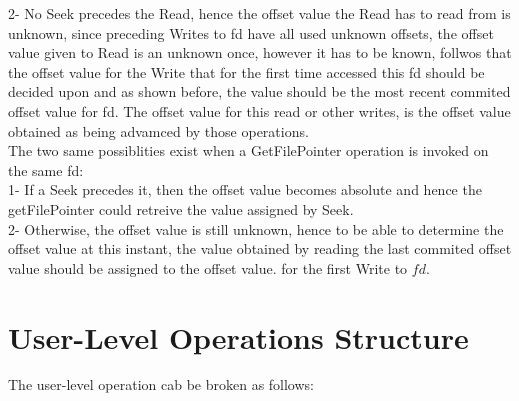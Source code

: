 \documentclass[a4paper, 11pt]{article}
\begin{document}
2- No Seek precedes the Read, hence the offset value the Read has to read from is unknown, since preceding Writes to fd have all used unknown offsets, the offset value given to Read is an unknown once, however it has to be known, follwos that the offset value for the Write that for the first time accessed this fd should be decided upon and as shown before, the value should be the most recent commited offset value for fd. The offset value for this read or other writes, is the offset value obtained as being advamced by those operations.\\  

The two same possiblities exist when a GetFilePointer operation is invoked on the same fd:\\

1- If a Seek precedes it, then the offset value becomes absolute and hence the getFilePointer could retreive the value assigned by Seek.\\

2- Otherwise, the offset value is still unknown, hence to be able to determine the offset value at this instant, the value obtained by reading the last commited offset value should be assigned to the offset value. for the first Write to $fd$.\\






\section{User-Level Operations Structure}

The user-level operation cab be broken as follows:\\
\end{document}
